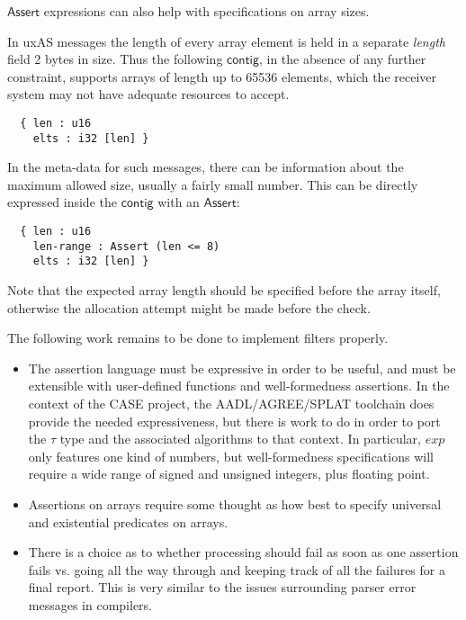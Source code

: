\documentclass[sigplan,10pt,anonymous,review]{acmart}\settopmatter{printfolios=true,printccs=false,printacmref=false}
\newcommand{\konst}[1]{\ensuremath{\mathsf{#1}}}
\begin{document}
\noindent \konst{Assert} expressions can also help with specifications
on array sizes.

\begin{example}

In uxAS messages the length of every array element is held in a
separate \emph{length} field 2 bytes in size. Thus the following
\konst{contig}, in the absence of any further constraint, supports arrays of
length up to 65536 elements, which the receiver system may not have
adequate resources to accept.

\begin{verbatim}
  { len : u16
    elts : i32 [len] }
\end{verbatim}

\noindent In the meta-data for such messages, there can be information
about the maximum allowed size, usually a fairly small number. This
can be directly expressed inside the \konst{contig} with an \konst{Assert}:

\begin{verbatim}
  { len : u16
    len-range : Assert (len <= 8)
    elts : i32 [len] }
\end{verbatim}

\noindent Note that the expected array length should be specified
before the array itself, otherwise the allocation attempt might be
made before the check.
\end{example}


\noindent The following work remains to be done to implement filters
properly.

\begin{itemize}

\item The assertion language must be expressive in order to be useful,
  and must be extensible with user-defined functions and
  well-formedness assertions. In the context of the CASE project, the
  AADL/AGREE/SPLAT toolchain does provide the needed expressiveness,
  but there is work to do in order to port the $\tau$ type and the
  associated algorithms to that context. In particular, $\mathit{exp}$
  only features one kind of numbers, but well-formedness
  specifications will require a wide range of signed and unsigned
  integers, plus floating point.

\item Assertions on arrays require some thought as how best to specify
  universal and existential predicates on arrays.

\item There is a choice as to whether processing should fail as soon
  as one assertion fails vs. going all the way through and keeping
  track of all the failures for a final report. This is very similar
  to the issues surrounding parser error messages in compilers.

\end{itemize}
\end{document}
